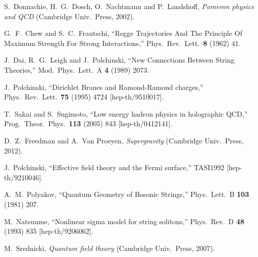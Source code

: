 \begin{thebibliography}{99}

%
%

  S.~Donnachie, H.~G.~Dosch, O.~Nachtmann and P.~Landshoff,
  \textit{Pomeron physics and QCD} (Cambridge Univ.\ Press, %
  2002).

  G.~F.~Chew and S.~C.~Frautschi,
  ``Regge Trajectories And The Principle Of Maximum Strength For Strong Interactions,''
  Phys.\ Rev.\ Lett.\  {\bf 8 } (1962)  41.

  J.~Dai, R.~G.~Leigh and J.~Polchinski,
  ``New Connections Between String Theories,''
  Mod.\ Phys.\ Lett.\ A {\bf 4} (1989) 2073.

  J.~Polchinski,
  ``Dirichlet Branes and Ramond-Ramond charges,''
  Phys.\ Rev.\ Lett.\  {\bf 75} (1995) 4724
  [hep-th/9510017].

  T.~Sakai and S.~Sugimoto,
  ``Low energy hadron physics in holographic QCD,''
  Prog.\ Theor.\ Phys.\  {\bf 113} (2005) 843
  [hep-th/0412141].
  
  D.~Z.~Freedman and A.~Van Proeyen, \textit{Supergravity} (Cambridge Univ.\ Press, 2012).

  J.~Polchinski,
  ``Effective field theory and the Fermi surface,'' TASI1992
  [hep-th/9210046].

  A.~M.~Polyakov,
  ``Quantum Geometry of Bosonic Strings,''
  Phys.\ Lett.\ B {\bf 103} (1981) 207.
 
  M.~Natsuume,
  ``Nonlinear sigma model for string solitons,''
  Phys.\ Rev.\ D {\bf 48} (1993) 835
  [hep-th/9206062].

  M.~Srednicki,
  \textit{Quantum field theory}
  (Cambridge Univ.\ Press, 2007).


\end{thebibliography}

